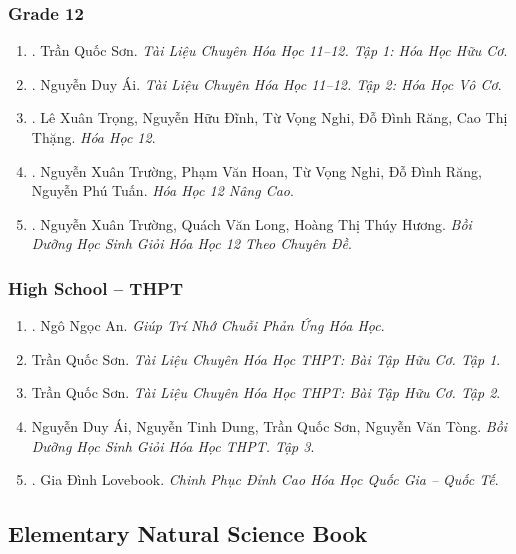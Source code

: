 \documentclass{article}
\begin{document}
\subsubsection{Grade 12}

\begin{enumerate}	
	\item \cite{Son2021}. Trần Quốc Sơn. \textit{Tài Liệu Chuyên Hóa Học 11--12. Tập 1: Hóa Học Hữu Cơ}.\hfill{\sf[reading]}
	\item \cite{Ai2022}. Nguyễn Duy Ái. \textit{Tài Liệu Chuyên Hóa Học 11--12. Tập 2: Hóa Học Vô Cơ}.\hfill{\sf[reading]}
	\item \cite{SGK_Hoa_Hoc_12_co_ban}. Lê Xuân Trọng, Nguyễn Hữu Đĩnh, Từ Vọng Nghi, Đỗ Đình Răng, Cao Thị Thặng. \textit{Hóa Học 12}.\hfill{\sf[reading]}
	\item \cite{SGK_Hoa_Hoc_12_nang_cao}. Nguyễn Xuân Trường, Phạm Văn Hoan, Từ Vọng Nghi, Đỗ Đình Răng, Nguyễn Phú Tuấn. \textit{Hóa Học 12 Nâng Cao}.\\\mbox{}\hfill{\sf[reading]}
	\item \cite{Truong_Long_Huong_bdhsg_Hoa_Hoc_12}. Nguyễn Xuân Trường, Quách Văn Long, Hoàng Thị Thúy Hương. \textit{Bồi Dưỡng Học Sinh Giỏi Hóa Học 12 Theo Chuyên Đề}.\hfill{\sf[reading]}
\end{enumerate}

\subsubsection{High School -- THPT}

\begin{enumerate}
	\item \cite{An_chuoi_PUHH}. Ngô Ngọc An. \textit{Giúp Trí Nhớ Chuỗi Phản Ứng Hóa Học}.\hfill{\sf[reading]}
	\item Trần Quốc Sơn. \textit{Tài Liệu Chuyên Hóa Học THPT: Bài Tập Hữu Cơ. Tập 1}.
	\item Trần Quốc Sơn. \textit{Tài Liệu Chuyên Hóa Học THPT: Bài Tập Hữu Cơ. Tập 2}.
	\item Nguyễn Duy Ái, Nguyễn Tinh Dung, Trần Quốc Sơn, Nguyễn Văn Tòng. \textit{Bồi Dưỡng Học Sinh Giỏi Hóa Học THPT. Tập 3}.
	\item \cite{Lovebook2022}. Gia Đình Lovebook. \textit{Chinh Phục Đỉnh Cao Hóa Học Quốc Gia -- Quốc Tế}.\hfill{\sf[reading]}
\end{enumerate}

\subsection{Elementary Natural Science Book}
\end{document}
